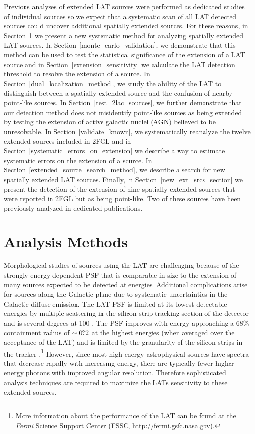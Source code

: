 \documentclass[12pt,preprint]{aastex}
\newcommand{\mev}{\text{MeV}\xspace}
\newcommand{\gev}{\text{GeV}\xspace}
\newcommand{\fermi}{\textit{Fermi}\xspace}
\begin{document}
Previous analyses of extended LAT sources were performed as dedicated
studies of individual sources so we expect that a systematic scan of
all LAT detected sources could uncover additional spatially extended
sources.  For these reasons, in Section~\ref{analysis_methods_section}
we present a new systematic method for analyzing spatially extended
LAT sources.  In Section~\ref{monte_carlo_validation}, we demonstrate
that this method can be used to test the statistical significance of the
extension of a LAT source and in Section~\ref{extension_sensitivity}
we calculate the LAT detection threshold to resolve the extension
of a source.  In Section~\ref{dual_localization_method}, we
study the ability of the LAT to distinguish between a spatially
extended source and the confusion of nearby point-like sources.
In Section~\ref{test_2lac_sources}, we further demonstrate that our
detection method does not misidentify point-like sources as being
extended by testing the extension of active galactic nuclei (AGN)
believed to be unresolvable.  In Section~\ref{validate_known},
we systematically reanalyze the twelve extended sources included
in 2FGL and in Section~\ref{systematic_errors_on_extension}
we describe a way to estimate systematic errors on the extension of a source.
In Section~\ref{extended_source_search_method}, we
describe a search for new spatially extended LAT sources. Finally,
in Section~\ref{new_ext_srcs_section} we present the detection of the
extension of nine spatially extended sources that were reported in 2FGL
but as being point-like.  Two of these sources have been previously analyzed in
dedicated publications.


\section{Analysis Methods}
\label{analysis_methods_section}

Morphological studies of sources using the LAT are challenging
because of the strongly energy-dependent PSF that is comparable in
size to the extension of many sources expected to be detected at
\gev energies.  Additional complications arise for sources along
the Galactic plane due to systematic uncertainties in the Galactic
diffuse emission.  The LAT PSF is limited at its lowest detectable
energies by multiple scattering in the silicon strip tracking section
of the detector and is several degrees at 100 \mev.  The PSF improves
with energy approaching a 68\% containment radius of $\sim0\mbox{$.\!\!^\circ$}2$ at
the highest energies (when averaged over the acceptance of the LAT)
and is limited by the granularity of the silicon strips in the tracker
\citep{atwood_LAT_mission,on_orbit_calibration,lat_on_orbit_psf}.\footnote{More
information about the performance of the LAT can be found at the \fermi
Science Support Center (FSSC, \url{http://fermi.gsfc.nasa.gov}).} However,
since most high energy astrophysical sources have spectra that decrease
rapidly with increasing energy, there are typically fewer higher
energy photons with improved angular resolution. Therefore sophisticated
analysis techniques are required to maximize the LATs sensitivity
to these extended sources.
\end{document}
